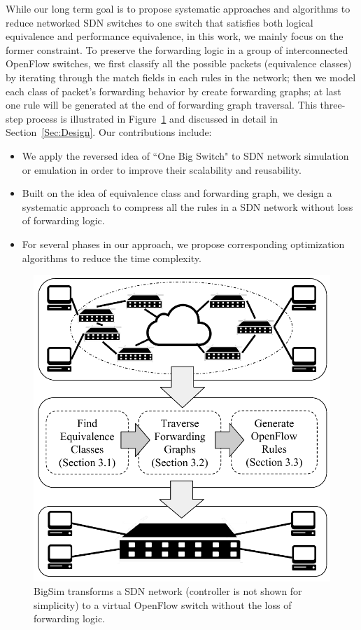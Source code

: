 While our long term goal is to propose systematic approaches and algorithms to reduce
networked SDN switches to one switch that satisfies both logical equivalence and performance
equivalence, in this work, we mainly focus on the former constraint.
To preserve the forwarding logic in a group of interconnected OpenFlow switches,
we first classify all the possible packets (equivalence classes) by iterating through
the match fields in each rules in the network;
then we model each class of packet's forwarding behavior by create forwarding graphs;
at last one rule will be generated at the end of forwarding graph traversal.
This three-step process is illustrated in Figure~\ref{Fig:BigSimOverview} and discussed
in detail in Section~\ref{Sec:Design}.
Our contributions include:
\begin{itemize}
\item We apply the reversed idea of ``One Big Switch"\cite{OneBigSwitchAbstraction}
        to SDN network simulation or emulation in order to
        improve their scalability and reusability.
\item Built on the idea of equivalence class and forwarding graph, we design
        a systematic approach to compress all the rules in a SDN network without
        loss of forwarding logic.
\item For several phases in our approach, we propose corresponding optimization
        algorithms to reduce the time complexity.
\end{itemize}

\begin{figure}[t]
\centering
\includegraphics[scale=.6]{figures/BigSimOverview.pdf}
\caption{BigSim transforms a SDN network (controller is not shown for simplicity) to a
virtual OpenFlow switch without the loss of forwarding logic.}
\label{Fig:BigSimOverview}
\end{figure}

